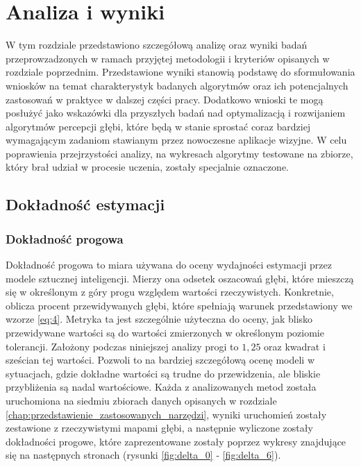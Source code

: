 \chapter{Analiza i wyniki}\label{chap:analiza_i_wyniki}

W tym rozdziale przedstawiono szczegółową analizę oraz wyniki badań przeprowzadzonych w ramach przyjętej metodologii i kryteriów opisanych w rozdziale poprzednim. Przedstawione wyniki stanowią podstawę do sformułowania wniosków na temat charakterystyk badanych algorytmów oraz ich potencjalnych zastosowań w praktyce w dalszej części pracy. Dodatkowo wnioski te mogą posłużyć jako wskazówki dla przyszłych badań nad optymalizacją i rozwijaniem algorytmów percepcji głębi, które będą w stanie sprostać coraz bardziej wymagającym zadaniom stawianym przez nowoczesne aplikacje wizyjne. W celu poprawienia przejrzystości analizy, na wykresach algorytmy testowane na zbiorze, który brał udział w procesie uczenia, zostały specjalnie oznaczone.

\section{Dokładność estymacji}
\subsection{Dokładność progowa}
Dokładność progowa to miara używana do oceny wydajności estymacji przez modele sztucznej inteligencji. Mierzy ona odsetek oszacowań głębi, które mieszczą się w określonym z góry progu względem wartości rzeczywistych. Konkretnie, oblicza procent przewidywanych głębi, które spełniają warunek przedstawiony we wzorze \ref{eq:4}. Metryka ta jest szczególnie użyteczna do oceny, jak blisko przewidywane wartości są do wartości zmierzonych w określonym poziomie tolerancji. Założony podczas niniejszej analizy progi to $1,25$ oraz kwadrat i sześcian tej wartości. Pozwoli to na bardziej szczegółową ocenę modeli w sytuacjach, gdzie dokładne wartości są trudne do przewidzenia, ale bliskie przybliżenia są nadal wartościowe. Każda z analizowanych metod została uruchomiona na siedmiu zbiorach danych opisanych w rozdziale \ref{chap:przedstawienie_zastosowanych_narzędzi}, wyniki uruchomień zostały zestawione z rzeczywistymi mapami głębi, a następnie wyliczone zostały dokładności progowe, które zaprezentowane zostały poprzez wykresy znajdujące się na następnych stronach (rysunki \ref{fig:delta_0} - \ref{fig:delta_6}).

